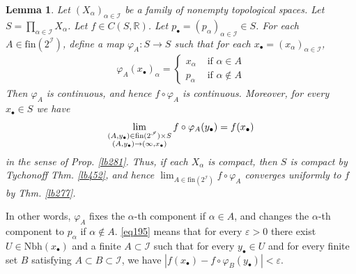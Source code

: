 \documentclass[12pt,b5paper,notitlepage]{article}
\theoremstyle{definition}
\theoremstyle{plain}
\newtheorem{lm}[df]{Lemma}
\newcommand{\scr}{\mathscr}
\newcommand{\blt}{\bullet}
\newcommand{\Rbb}{\mathbb R}
\newcommand{\fin}{\mathrm{fin}}
\newcommand{\dps}{\displaystyle}
\newcommand{\Nbh}{\mathrm{Nbh}}
\newcommand{\eps}{\varepsilon}
\numberwithin{equation}{section}
\begin{document}
\begin{lm}\label{lb455}
Let $(X_\alpha)_{\alpha\in\scr I}$ be a family of nonempty topological spaces. Let $S=\prod_{\alpha\in\scr I} X_\alpha$. Let $f\in C(S,\Rbb)$. Let $p_\blt=(p_\alpha)_{\alpha\in\scr I}\in S$. For each $A\in\fin(2^{\scr I})$, define a map $\varphi_A:S\rightarrow S$ such that for each $x_\blt=(x_\alpha)_{\alpha\in\scr I}$,
\begin{gather*}
\varphi_A(x_\blt)_\alpha=\left\{
\begin{array}{ll}
x_\alpha&\text{ if }\alpha\in A\\
p_\alpha&\text{ if }\alpha\notin A
\end{array}
\right.
\end{gather*}
Then $\varphi_A$ is continuous, and hence $f\circ\varphi_A$ is continuous. Moreover, for every $x_\blt\in S$ we have
\begin{align}\label{eq195}
\lim_{
\begin{subarray}{c}
(A,y_\blt)\in\fin(2^{\scr I})\times S\\
(A,y_\blt)\rightarrow (\infty,x_\blt)
\end{subarray}
}f\circ\varphi_A(y_\blt)=f(x_\blt)
\end{align}
in the sense of Prop. \ref{lb281}. Thus, if each $X_\alpha$ is compact, then $S$ is compact by Tychonoff Thm. \ref{lb452}, and hence $\dps\lim_{A\in\fin(2^{\scr I})}f\circ\varphi_A$ converges uniformly to $f$ by Thm. \ref{lb277}.
\end{lm}

In other words, $\varphi_A$ fixes the $\alpha$-th component if $\alpha\in A$, and changes the $\alpha$-th component to $p_\alpha$ if $\alpha\notin A$. \eqref{eq195} means that for every $\eps>0$ there exist $U\in\Nbh(x_\blt)$ and a finite $A\subset \scr I$ such that for every $y_\blt\in U$ and for every finite set $B$ satisfying $A\subset B\subset\scr I$, we have $|f(x_\blt)-f\circ\varphi_B(y_\blt)|<\eps$.
\end{document}
